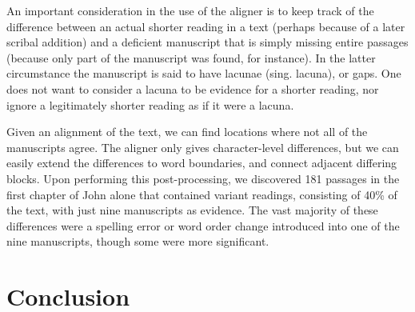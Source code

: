 \documentclass[onecolumn, 12pt]{article}
\begin{document}
An important consideration in the use of the aligner is to keep track of the
difference between an actual shorter reading in a text (perhaps because of a
later scribal addition) and a deficient manuscript that is simply missing
entire passages (because only part of the manuscript was found, for instance).
In the latter circumstance the manuscript is said to have lacunae (sing.
lacuna), or gaps.  One does not want to consider a lacuna to be evidence for a
shorter reading, nor ignore a legitimately shorter reading as if it were a
lacuna.

Given an alignment of the text, we can find locations where not all of the
manuscripts agree.  The aligner only gives character-level differences, but we
can easily extend the differences to word boundaries, and connect adjacent
differing blocks.  Upon performing this post-processing, we discovered 181
passages in the first chapter of John alone that contained variant readings,
consisting of 40\% of the text, with just nine manuscripts as evidence.  The
vast majority of these differences were a spelling error or word order change
introduced into one of the nine manuscripts, though some were more significant.

\section{Conclusion}
\label{sec:conclusion}



\end{document}
